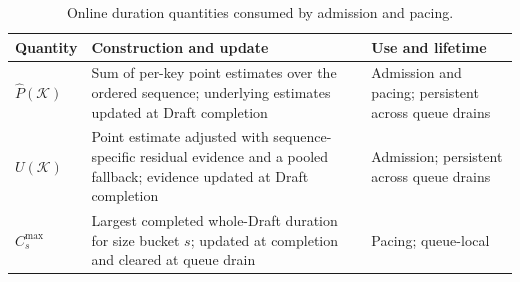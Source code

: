 \begin{table}[t]
  \centering
  \caption{Online duration quantities consumed by admission and pacing.}
  \label{tab:duration-estimates}
  {\footnotesize
  \renewcommand{\arraystretch}{1.08}
  \setlength{\tabcolsep}{3pt}
  \begin{tabular}{@{}>{\raggedright\arraybackslash}p{54pt}
                       >{\raggedright\arraybackslash}p{112pt}
                       >{\raggedright\arraybackslash}p{57pt}@{}}
    \toprule
    \textbf{Quantity} & \textbf{Construction and update} & \textbf{Use and lifetime} \\
    \midrule
    \(\hat P(\mathcal{K})\) &
    Sum of per-key point estimates over the ordered sequence; underlying estimates updated at Draft completion &
    Admission and pacing; persistent across queue drains \\
    \(U(\mathcal{K})\) &
    Point estimate adjusted with sequence-specific residual evidence and a pooled fallback; evidence updated at Draft completion &
    Admission; persistent across queue drains \\
    \(C^{\max}_s\) &
    Largest completed whole-Draft duration for size bucket \(s\); updated at completion and cleared at queue drain &
    Pacing; queue-local \\
    \bottomrule
  \end{tabular}}
\end{table}
